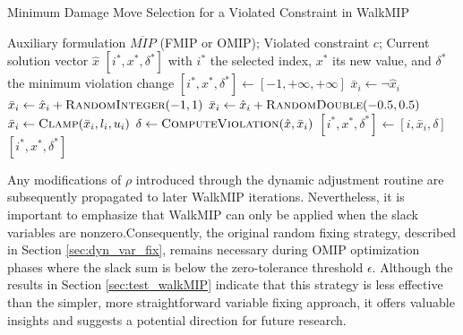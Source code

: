 \begin{algorithm}[H]
\caption{Minimum Damage Move Selection for a Violated Constraint in WalkMIP}\label{alg:min_DMG_WalkMIP}
\begin{algorithmic}[1]
\Require Auxiliary formulation $\overline{MIP}$ (FMIP or OMIP); Violated constraint $c$; Current solution vector $\hat{x}$
\Ensure $[i^*, x^*, \delta^*]$ with $i^*$ the selected index, $x^*$ its new value, and $\delta^*$ the minimum violation change
    \State $[i^*, x^*, \delta^*] \gets [-1,+\infty,+\infty]$
         $\bar{x}_i \gets \neg \hat{x}_i$
         $\bar{x}_i \gets \hat{x}_i + \Call{RandomInteger}{-1,1}$
         $\bar{x}_i \gets \hat{x}_i + \Call{RandomDouble}{-0.5,0.5}$
        \EndIf
        \State $\bar{x}_i \gets \Call{Clamp}{\bar{x}_i,l_i,u_i}$
        \State $\delta \gets \Call{ComputeViolation}{\hat{x},\bar{x}_i}$
        \If{$\delta < \delta^*$}
            \State $[i^*, x^*, \delta^*] \gets [i,\bar{x}_i,\delta]$
        \EndIf
    \EndFor
    \State \Return $[i^*, x^*, \delta^*]$
\EndFunction
\end{algorithmic}
\end{algorithm}
Any modifications of $\rho$ introduced through the dynamic adjustment routine are subsequently propagated to later WalkMIP iterations. Nevertheless, it is important to emphasize that WalkMIP can only be applied when the slack variables are nonzero.Consequently, the original random fixing strategy, described in Section \ref{sec:dyn_var_fix}, remains necessary during OMIP optimization phases where the slack sum is below the zero-tolerance threshold $\epsilon$.
Although the results in Section \ref{sec:test_walkMIP} indicate that this strategy is less effective than the simpler, more straightforward variable fixing approach, it offers valuable insights and suggests a potential direction for future research.